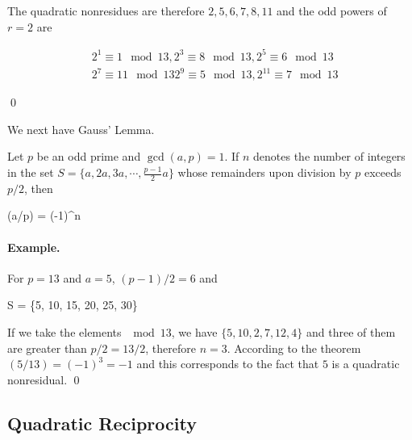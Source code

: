 The quadratic nonresidues are therefore $2, 5, 6, 7, 8, 11$ and the odd powers of $r=2$ are

\begin{align*}
& 2^1 \equiv 1 \mod 13, 2^3 \equiv 8 \mod 13, 2^5 \equiv 6 \mod 13 \\
& 2^7 \equiv 11 \mod 13 2^9 \equiv 5 \mod 13, 2^{11} \equiv 7 \mod 13
\end{align*}

\qed

We next have Gauss' Lemma.

\begin{theorem}
Let $p$ be an odd prime and $\gcd(a,p)=1$. If $n$ denotes the number of integers in the set $S = \{a, 2a, 3a, \cdots, \frac{p-1}{2}a \}$ whose remainders upon division by $p$ exceeds $p/2$, then

\bee
(a/p) = (-1)^n
\eee

\end{theorem}

\paragraph{Example.} For $p=13$ and $a=5$, $(p-1)/2 = 6$ and

\bee
S = \{5, 10, 15, 20, 25, 30\}
\eee

If we take the elements $\mod 13$, we have $\{5, 10, 2, 7, 12, 4\}$ and three of them are greater than $p/2 = 13/2$, therefore $n=3$. According to the theorem $(5/13) = (-1)^3 = -1$ and this corresponds to the fact that $5$ is a quadratic nonresidual. \qed

\subsection{Quadratic Reciprocity}


